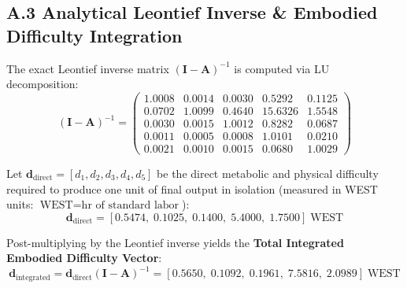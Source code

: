 \documentclass[preprint,12pt,authoryear]{elsarticle}
\theoremstyle{definition}
\begin{document}
\subsection*{A.3 Analytical Leontief Inverse \& Embodied Difficulty Integration}

The exact Leontief inverse matrix $(\mathbf{I} - \mathbf{A})^{-1}$ is computed via LU decomposition:
\begin{equation}
(\mathbf{I} - \mathbf{A})^{-1} = \begin{pmatrix} 
1.0008 & 0.0014 & 0.0030 & 0.5292 & 0.1125 \\ 
0.0702 & 1.0099 & 0.4640 & 15.6326 & 1.5548 \\ 
0.0030 & 0.0015 & 1.0012 & 0.8282 & 0.0687 \\ 
0.0011 & 0.0005 & 0.0008 & 1.0101 & 0.0210 \\ 
0.0021 & 0.0010 & 0.0015 & 0.0680 & 1.0029 
\end{pmatrix} \label{eq:leontief_inverse}
\end{equation}

Let $\mathbf{d}_{\text{direct}} = [d_1, d_2, d_3, d_4, d_5]$ be the direct metabolic and physical difficulty required to produce one unit of final output in isolation (measured in WEST units: $\text{WEST} = \text{hr of standard labor}$):
\begin{equation}
\mathbf{d}_{\text{direct}} = [0.5474, \; 0.1025, \; 0.1400, \; 5.4000, \; 1.7500] \; \text{WEST} \label{eq:d_direct}
\end{equation}

Post-multiplying by the Leontief inverse yields the \textbf{Total Integrated Embodied Difficulty Vector}:
\begin{equation}
\mathbf{d}_{\text{integrated}} = \mathbf{d}_{\text{direct}} (\mathbf{I} - \mathbf{A})^{-1} = [0.5650, \; 0.1092, \; 0.1961, \; 7.5816, \; 2.0989] \; \text{WEST} \label{eq:d_integrated}
\end{equation}
\end{document}
